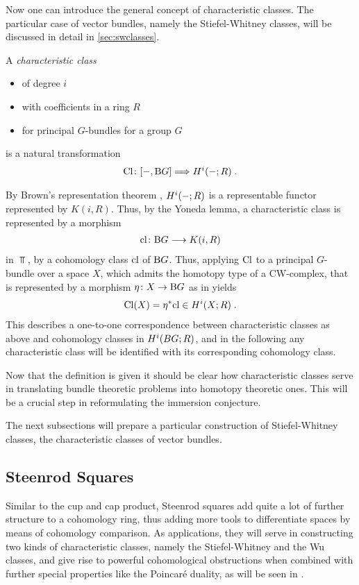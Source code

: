 Now one can introduce the general concept of characteristic
classes. The particular case of vector bundles, namely the
Stiefel-Whitney classes, will be discussed in detail in
\autoref{sec:swclasses}.
\begin{Def}
  A \emph{characteristic class}
  \begin{itemize}
  \item of degree $i$
  \item with coefficients in a ring $R$
  \item for principal $G$-bundles for a group $G$
  \end{itemize}
  is a natural transformation
  \begin{gather*}
    \mathrm{Cl}\colon [-, \mathrm{B}G] \Longrightarrow H^i(-; R)\;.
  \end{gather*}
\end{Def}
\begin{Rem}
  By Brown's representation theorem ,
  $H^i(-;R)$ is a representable functor represented by $K(i,R)$.
  Thus, by the Yoneda lemma, a characteristic class is
  represented by a morphism
  \begin{gather*}
    \mathrm{cl}\colon \mathrm{B}G \longrightarrow K(i, R)
  \end{gather*}
  in $\Top$, \idest by a cohomology class $\mathrm{cl}$ of $\mathrm{B}G$.
  Thus, applying $\mathrm{Cl}$ to a principal $G$-bundle over a
  space $X$, which admits the homotopy type of a CW-complex, that is
  represented by a morphism $\eta\colon X\to\mathrm{B}G$
  as in 
  yields
  \begin{gather*}
    \mathrm{Cl}(X) = {\eta}^* \mathrm{cl} \in H^i(X;R)
    \;.
  \end{gather*}
  This describes a one-to-one correspondence between
  characteristic classes as above and cohomology classes in
  $H^i(BG;R)$, and in the following any characteristic class will be
  identified with its corresponding cohomology class.
\end{Rem}

Now that the definition is given it should be clear how 
characteristic classes serve in translating bundle theoretic problems
into homotopy theoretic ones. This will be a crucial step in
reformulating the immersion conjecture.

The next subsections will prepare a particular construction of
Stiefel-Whitney classes, the characteristic classes of vector
bundles.

\subsection{Steenrod Squares}\label{sec:steenrodsquares}
Similar to the cup and cap product, Steenrod squares add quite a lot
of further structure to a cohomology ring, thus adding more tools to
differentiate spaces by means of cohomology comparison.
As applications, they will serve in constructing two kinds of
characteristic classes, namely the Stiefel-Whitney and the Wu
classes, and give rise to powerful cohomological obstructions
when combined with further special properties like the Poincaré
duality, as will be seen in \label{chap:massey}.

